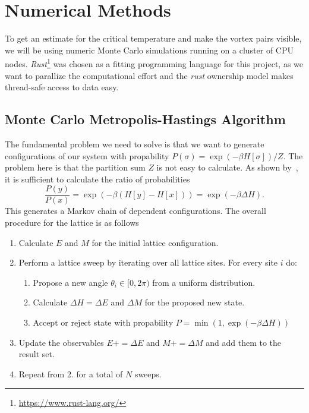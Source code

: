 \section{Numerical Methods}
To get an estimate for the critical temperature and make the vortex pairs visible, we will be using numeric Monte Carlo simulations running on a cluster of CPU nodes. \emph{Rust}\footnote{\url{https://www.rust-lang.org/}} was chosen as a fitting programming language for this project, as we want to parallize the computational effort and the \emph{rust} ownership model makes thread-safe access to data easy.

\subsection{Monte Carlo Metropolis-Hastings Algorithm}\label{sec:metropolis_hastings}
The fundamental problem we need to solve is that we want to generate configurations of our system with propability $P(\sigma) = \exp{(-\beta H[\sigma])}/Z$. The problem here is that the partition sum $Z$ is not easy to calculate. As shown by~\citet{metropolis}, it is sufficient to calculate the ratio of probabilities
\begin{equation}
	\frac{P(y)}{P(x)} = \exp{(-\beta(H[y] - H[x]))} = \exp{(-\beta \Delta H)}.
\end{equation}
This generates a Markov chain of dependent configurations. The overall procedure for the lattice is as follows
\begin{enumerate}
	\item Calculate $E$ and $M$ for the initial lattice configuration.
	\item Perform a lattice sweep by iterating over all lattice sites. For every site $i$ do:
	\begin{enumerate}
		\item Propose a new angle $\theta_i \in [0,2\pi)$ from a uniform distribution.
		\item Calculate $\Delta H = \Delta E$ and $\Delta M$ for the proposed new state.
		\item Accept or reject state with propability $P = \min{(1, \exp{(-\beta\Delta H)})}$
	\end{enumerate}
	\item Update the observables $E \mathrel{{+}{=}} \Delta E$ and $M \mathrel{{+}{=}} \Delta M$ and add them to the result set.
	\item Repeat from 2. for a total of $N$ sweeps.
\end{enumerate}


